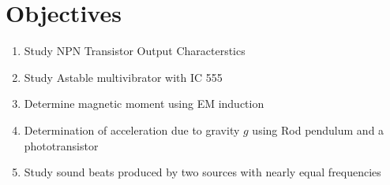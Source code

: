 \section{Objectives}
\begin{enumerate}
    \item Study NPN Transistor Output Characterstics
    \item Study Astable multivibrator with IC 555
    \item Determine magnetic moment using EM induction
    \item Determination of acceleration due to gravity $g$ using Rod pendulum and a phototransistor
    \item Study sound beats produced by two sources with nearly equal frequencies
\end{enumerate}